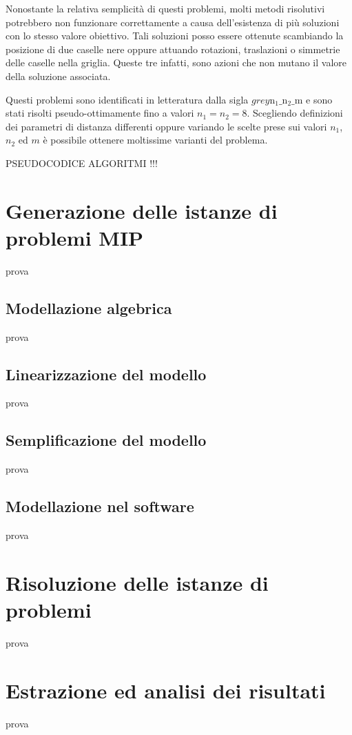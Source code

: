 Nonostante la relativa semplicità di questi problemi, molti metodi risolutivi potrebbero non funzionare correttamente a causa 
dell'esistenza di più soluzioni con lo stesso valore obiettivo. Tali soluzioni posso essere ottenute scambiando la posizione 
di due caselle nere oppure attuando rotazioni, traslazioni o simmetrie delle caselle nella griglia. Queste tre infatti,
sono azioni che non mutano il valore della soluzione associata.

Questi problemi sono identificati in letteratura dalla sigla $grey$n$_1\_$n$_2\_$m e sono stati risolti pseudo-ottimamente 
fino a valori $n_1 = n_2 = 8$. Scegliendo definizioni dei parametri di distanza differenti oppure variando le scelte prese sui 
valori $n_1$, $n_2$ ed $m$ è possibile ottenere moltissime varianti del problema.

PSEUDOCODICE ALGORITMI !!!


\section{Generazione delle istanze di problemi MIP}
prova

\subsection{Modellazione algebrica}
prova

\subsection{Linearizzazione del modello}
prova

\subsection{Semplificazione del modello}
prova

\subsection{Modellazione nel software}
prova




\section{Risoluzione delle istanze di problemi}
prova




\section{Estrazione ed analisi dei risultati}
prova